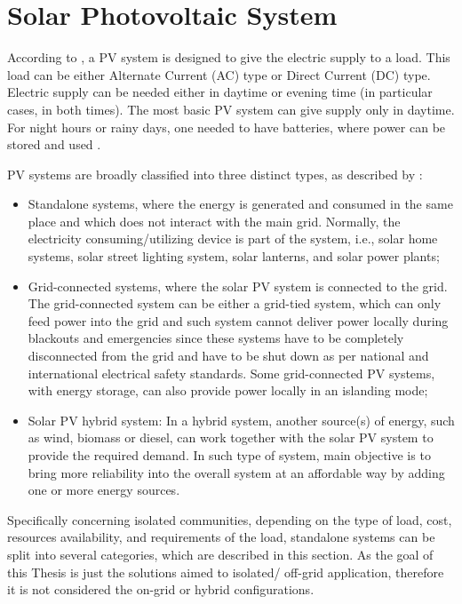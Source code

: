 \section{Solar Photovoltaic System }
According to \cite{Roy}, a PV system is designed to give the electric supply to a load. This load can be either Alternate Current (AC) type or Direct Current (DC) type. Electric supply can be needed either in daytime or evening time (in particular cases, in both times). The most basic PV system can give supply only in daytime.  For night hours or rainy days, one needed to have batteries, where power can be stored and used \cite{Gules}. 

PV systems are broadly classified into three distinct types, as described by \cite{Mohanty}: 

\begin{itemize}
\item Standalone systems, where the energy is generated and consumed in the same place and which does not interact with the main grid. Normally, the electricity consuming/utilizing device is part of the system, i.e., solar home systems, solar street lighting system, solar lanterns, and solar power plants; 
\item Grid-connected systems, where the solar PV system is connected to the grid. The grid-connected system can be either a grid-tied system, which can only feed power into the grid and such system cannot deliver power locally during blackouts and emergencies since these systems have to be completely disconnected from the grid and have to be shut down as per national and international electrical safety standards. Some grid-connected PV systems, with energy storage, can also provide power locally in an islanding mode; 
\item Solar PV hybrid system: In a hybrid system, another source(s) of energy, such as wind, biomass or diesel, can work together with the solar PV system to provide the required demand. In such type of system, main objective is to bring more reliability into the overall system at an affordable way by adding one or more energy sources.
\end{itemize}
 
Specifically concerning isolated communities, depending on the type of load, cost, resources availability, and requirements of the load, standalone systems can be split into several categories, which are described in this section. As the goal of this Thesis is just the solutions aimed to isolated/ off-grid application, therefore it is not considered the on-grid or hybrid configurations.
 
